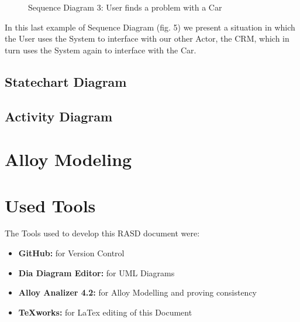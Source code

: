 \documentclass[a4paper]{article}
\begin{document}
\begin{figure}[h]
\centering
\vspace*{\fill}
\noindent{}%
\caption {Sequence Diagram 3: User finds a problem with a Car}
\vspace*{0.5cm}
\end{figure}
In this last example of Sequence Diagram (fig. 5) we present a situation in which the User uses the System to interface with our other Actor, the CRM, which in turn uses the System again to interface with the Car.
\newpage

\subsection{Statechart Diagram}
\subsection{Activity Diagram}
\section{Alloy Modeling}
\newpage

\section{Used Tools}
The Tools used to develop this RASD document were:
\begin{itemize}
	\item \textbf{GitHub:} for Version Control
	\item \textbf {Dia Diagram Editor:} for UML Diagrams
	\item \textbf{Alloy Analizer 4.2:} for Alloy Modelling and proving consistency 
	\item \textbf {TeXworks:} for LaTex editing of this Document
\end{itemize}
\newpage
\end{document}
